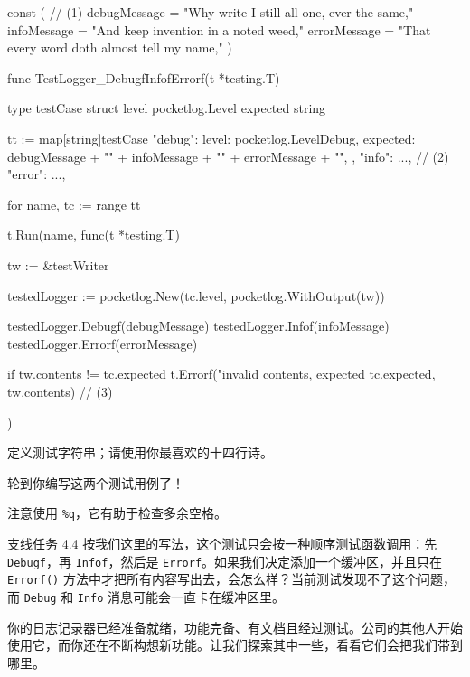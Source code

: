 \begin{gocode}[title={代码清单 4.15 \texttt{logger\_test.fo}：测试函数}]
const ( // (1)
    debugMessage = "Why write I still all one, ever the same,"
    infoMessage = "And keep invention in a noted weed,"
    errorMessage = "That every word doth almost tell my name,"
)

func TestLogger_DebugfInfofErrorf(t *testing.T) {
    type testCase struct {
        level    pocketlog.Level
        expected string
    }

    tt := map[string]testCase{
        "debug": {
            level:    pocketlog.LevelDebug,
            expected: debugMessage + "\n" +
                      infoMessage + "\n" +
                      errorMessage + "\n",
        },
        "info": {...}, // (2)
        "error": {...},
    }

    for name, tc := range tt {
        t.Run(name, func(t *testing.T) {
            tw := &testWriter{}

            testedLogger := pocketlog.New(tc.level, pocketlog.WithOutput(tw))

            testedLogger.Debugf(debugMessage)
            testedLogger.Infof(infoMessage)
            testedLogger.Errorf(errorMessage)

            if tw.contents != tc.expected {
                t.Errorf("invalid contents, expected %
                    tc.expected, tw.contents) // (3)
            }
        })
    }
}
\end{gocode}

\begin{codeannotations}
  \item 定义测试字符串；请使用你最喜欢的十四行诗。
  \item 轮到你编写这两个测试用例了！
  \item 注意使用 \texttt{\%q}，它有助于检查多余空格。
\end{codeannotations}

\begin{infobox}{支线任务 4.4}
按我们这里的写法，这个测试只会按一种顺序测试函数调用：先 \texttt{Debugf}，再 \texttt{Infof}，然后是 \texttt{Errorf}。如果我们决定添加一个缓冲区，并且只在 \texttt{Errorf()} 方法中才把所有内容写出去，会怎么样？当前测试发现不了这个问题，而 \texttt{Debug} 和 \texttt{Info} 消息可能会一直卡在缓冲区里。
\end{infobox}

你的日志记录器已经准备就绪，功能完备、有文档且经过测试。公司的其他人开始使用它，而你还在不断构想新功能。让我们探索其中一些，看看它们会把我们带到哪里。

